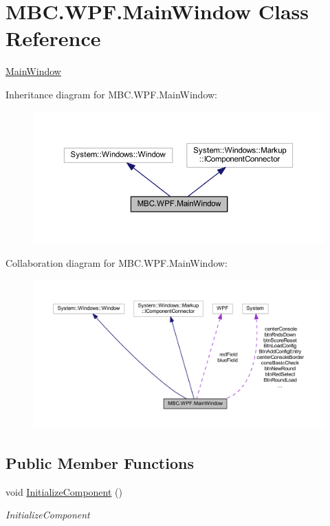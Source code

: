 \hypertarget{class_m_b_c_1_1_w_p_f_1_1_main_window}{\section{M\-B\-C.\-W\-P\-F.\-Main\-Window Class Reference}
\label{class_m_b_c_1_1_w_p_f_1_1_main_window}
}


\hyperlink{class_m_b_c_1_1_w_p_f_1_1_main_window}{Main\-Window}  




Inheritance diagram for M\-B\-C.\-W\-P\-F.\-Main\-Window\-:
\nopagebreak
\begin{figure}[H]
\begin{center}
\leavevmode
\includegraphics[width=350pt]{class_m_b_c_1_1_w_p_f_1_1_main_window__inherit__graph}
\end{center}
\end{figure}


Collaboration diagram for M\-B\-C.\-W\-P\-F.\-Main\-Window\-:
\nopagebreak
\begin{figure}[H]
\begin{center}
\leavevmode
\includegraphics[width=350pt]{class_m_b_c_1_1_w_p_f_1_1_main_window__coll__graph}
\end{center}
\end{figure}
\subsection*{Public Member Functions}
\begin{DoxyCompactItemize}
\item 
void \hyperlink{class_m_b_c_1_1_w_p_f_1_1_main_window_af7a6d8874e20196c3db0d7987d97819f}{Initialize\-Component} ()
\begin{DoxyCompactList}\small\item\em Initialize\-Component \end{DoxyCompactList}\end{DoxyCompactItemize}


